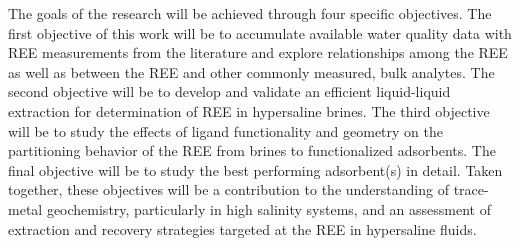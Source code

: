 The goals of the research will be achieved through four specific objectives.
The first objective of this work will be to accumulate available water quality data with REE measurements from the literature and explore relationships among the REE as well as between the REE and other commonly measured, bulk analytes.
The second objective will be to develop and validate an efficient liquid-liquid extraction for determination of REE in hypersaline brines.
The third objective will be to study the effects of ligand functionality and geometry on the partitioning behavior of the REE from brines to functionalized adsorbents.
The final objective will be to study the best performing adsorbent(s) in detail.
Taken together, these objectives will be a contribution to the understanding of trace-metal geochemistry, particularly in high salinity systems, and an assessment of extraction and recovery strategies targeted at the REE in hypersaline fluids.
